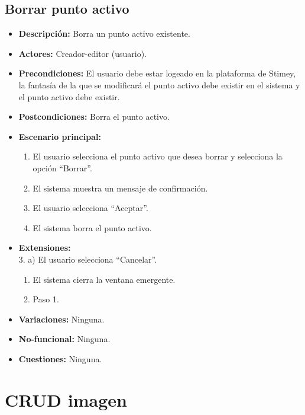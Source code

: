 \documentclass[12pt,letterpaper]{article}
\begin{document}
\subsection{Borrar punto activo}
\begin{itemize}
	\item \textbf{Descripción:} Borra un punto activo existente.
	\item \textbf{Actores:} Creador-editor (usuario).
	\item \textbf{Precondiciones:} El usuario debe estar logeado en la plataforma de Stimey, la fantasía de la que se modificará el punto activo debe existir en el sistema y el punto activo debe existir.
	\item \textbf{Postcondiciones:} Borra el punto activo.
	\item \textbf{Escenario principal:}
	\begin{enumerate}
		\item El usuario selecciona el punto activo que desea borrar y selecciona la opción ``Borrar''.
		\item El sistema muestra un mensaje de confirmación.
		\item El usuario selecciona ``Aceptar''.
		\item El sistema borra el punto activo.
	\end{enumerate}
	\item \textbf{Extensiones:} \\ 3. a) El usuario selecciona ``Cancelar''.
	\begin{enumerate}
		\item El sistema cierra la ventana emergente.
		\item Paso 1.
	\end{enumerate}
	\item \textbf{Variaciones:} Ninguna.
	\item \textbf{No-funcional:} Ninguna.
	\item \textbf{Cuestiones:} Ninguna.
\end{itemize}

\section{CRUD imagen} %
\end{document}

